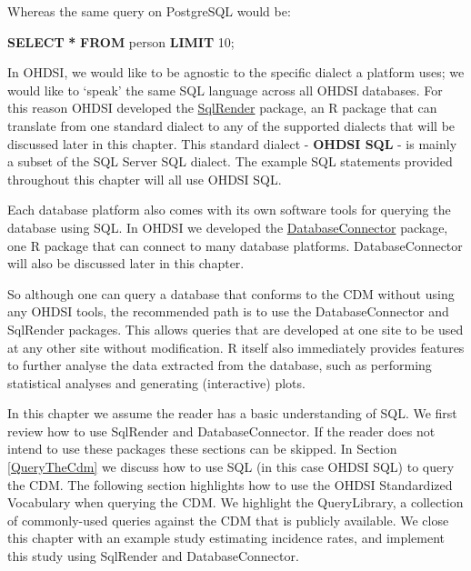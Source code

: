 \documentclass[11pt]{book}
\newenvironment{Shaded}{\begin{snugshade}}{\end{snugshade}}
\newcommand{\DecValTok}[1]{\textcolor[rgb]{0.00,0.00,0.81}{#1}}
\newcommand{\KeywordTok}[1]{\textcolor[rgb]{0.13,0.29,0.53}{\textbf{#1}}}
\newcommand{\NormalTok}[1]{#1}
\newcommand{\OperatorTok}[1]{\textcolor[rgb]{0.81,0.36,0.00}{\textbf{#1}}}
\theoremstyle{definition}
\theoremstyle{definition}
\theoremstyle{definition}
\theoremstyle{remark}
\begin{document}
Whereas the same query on PostgreSQL would be:

\begin{Shaded}
\begin{Highlighting}[]
\KeywordTok{SELECT} \OperatorTok{*} \KeywordTok{FROM}\NormalTok{ person }\KeywordTok{LIMIT} \DecValTok{10}\NormalTok{;}
\end{Highlighting}
\end{Shaded}

In OHDSI, we would like to be agnostic to the specific dialect a platform uses; we would like to `speak' the same SQL language across all OHDSI databases. For this reason OHDSI developed the \href{https://ohdsi.github.io/SqlRender/}{SqlRender} package, an R package that can translate from one standard dialect to any of the supported dialects that will be discussed later in this chapter. This standard dialect - \textbf{OHDSI SQL} - is mainly a subset of the SQL Server SQL dialect. The example SQL statements provided throughout this chapter will all use OHDSI SQL.

Each database platform also comes with its own software tools for querying the database using SQL. In OHDSI we developed the \href{https://ohdsi.github.io/DatabaseConnector/}{DatabaseConnector} package, one R package that can connect to many database platforms. DatabaseConnector will also be discussed later in this chapter.

So although one can query a database that conforms to the CDM without using any OHDSI tools, the recommended path is to use the DatabaseConnector and SqlRender packages. This allows queries that are developed at one site to be used at any other site without modification. R itself also immediately provides features to further analyse the data extracted from the database, such as performing statistical analyses and generating (interactive) plots.

In this chapter we assume the reader has a basic understanding of SQL. We first review how to use SqlRender and DatabaseConnector. If the reader does not intend to use these packages these sections can be skipped. In Section \ref{QueryTheCdm} we discuss how to use SQL (in this case OHDSI SQL) to query the CDM. The following section highlights how to use the OHDSI Standardized Vocabulary when querying the CDM. We highlight the QueryLibrary, a collection of commonly-used queries against the CDM that is publicly available. We close this chapter with an example study estimating incidence rates, and implement this study using SqlRender and DatabaseConnector.
\end{document}
